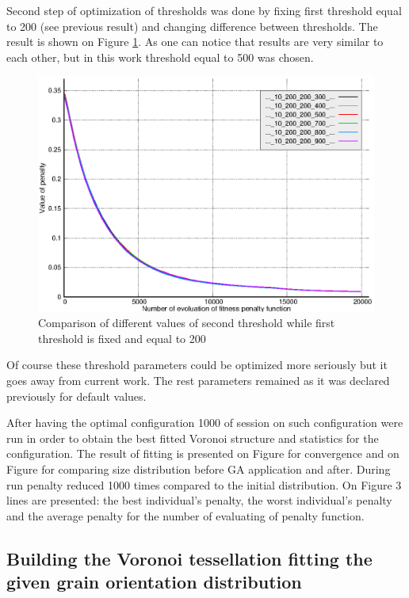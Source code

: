 \documentclass[12pt]{report}
\begin{document}
Second step of optimization of thresholds was done by fixing first threshold equal to 200 (see previous result) and changing difference between thresholds. The result is shown on Figure \ref{threshold2comparison}. As one can notice that results are very similar to each other, but in this work threshold equal to 500 was chosen.

\begin{figure}
    \centering
    \includegraphics[width=5.0in]{threshold2_comparison}
    \caption{Comparison of different values of second threshold while first threshold is fixed and equal to 200}
    \label{threshold2comparison}
\end{figure}

Of course these threshold parameters could be optimized more seriously but it goes away from current work. The rest parameters remained as it was declared previously for default values.

After having the optimal configuration 1000 of session on such configuration were run in order to obtain the best fitted Voronoi structure and statistics for the configuration. The result of fitting is presented on Figure for convergence and on Figure for comparing size distribution before GA application and after. During run penalty reduced 1000 times compared to the initial distribution.
On Figure 3 lines are presented: the best individual's penalty, the worst individual's penalty and the average penalty for the number of evaluating of penalty function.


\subsection{Building the Voronoi tessellation fitting the given grain orientation distribution}
\end{document}
